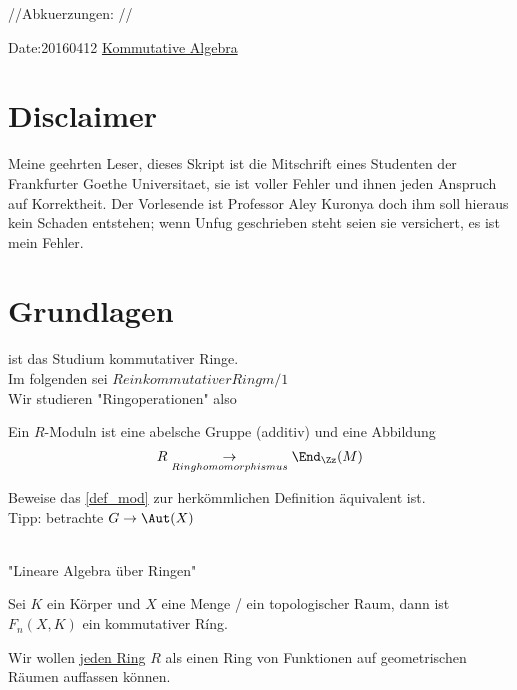 //Abkuerzungen:
//\providecommand{\idealin}{dreieck nach rechts}

Date:20160412
\underline{Kommutative Algebra}
\section{Disclaimer}
Meine geehrten Leser,
dieses Skript ist die Mitschrift eines Studenten der Frankfurter Goethe Universitaet, sie ist voller Fehler und ihnen jeden Anspruch auf Korrektheit.
Der Vorlesende ist Professor Aley Kuronya doch ihm soll hieraus kein Schaden entstehen; wenn Unfug geschrieben steht seien sie versichert, es ist mein Fehler.
\section{Grundlagen}
ist das Studium kommutativer Ringe.\\
Im folgenden sei \( R ein kommutativer Ring m/ 1 \) \\
Wir studieren "Ringoperationen" also  \\
\begin{defn}[Moduln] \label{def_mod}
Ein \(R\)-Moduln ist eine abelsche Gruppe (additiv) und eine Abbildung 
\[R \underset{Ringhomomorphismus}{\to} \End_\Zz(M) \]
\end{defn}
\begin{hausaufgabe}
Beweise das \ref{def_mod} zur herk\"ommlichen Definition \"aquivalent ist. \\
Tipp: betrachte \( G \to \Aut(X) \)
\end{hausaufgabe}
\\
"Lineare Algebra \"uber Ringen" \\
\begin{bsp}
Sei \( K \)  ein K\"orper und \( X \) eine Menge / ein topologischer Raum, dann ist \( F_n (X,K ) \) ein kommutativer Ríng.
\end{bsp}
\begin{Ziel}
Wir wollen \underline{jeden Ring} \( R \) als einen Ring von Funktionen auf geometrischen R\"aumen auffassen k\"onnen. \\
\end{Ziel}

